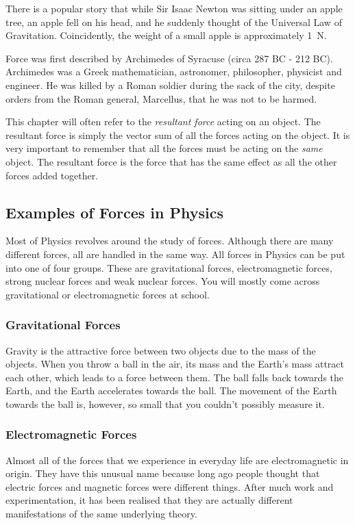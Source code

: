 \begin{IFact}{There is a popular story that while Sir Isaac Newton was sitting under an apple tree, an apple fell on his head, and he suddenly thought of the Universal Law of Gravitation. Coincidently, the weight of a small apple is approximately 1~N.}\end{IFact}

\begin{IFact}{Force was first described by Archimedes of Syracuse (circa 287 BC - 212 BC). Archimedes was a Greek mathematician, astronomer, philosopher, physicist and engineer. He was killed by a Roman soldier during the sack of the city, despite orders from the Roman general, Marcellus, that he was not to be harmed.}
\end{IFact}

This chapter will often refer to the \emph{resultant force} acting on an object. The resultant force is simply the vector sum of all the forces acting on the object. It is very important to remember that all the forces must be acting on the \emph{same} object. The resultant force is the force that has the same effect as all the other forces added together.

\subsection{Examples of Forces in Physics}
Most of Physics revolves around the study of forces. Although there are many different forces, all are handled in the same way. All forces in Physics can be put into one of four groups. These are gravitational forces, electromagnetic forces, strong nuclear forces and weak nuclear forces. You will mostly come across gravitational or electromagnetic forces at school.

\subsubsection{Gravitational Forces}
Gravity is the attractive force between two objects due to the mass of the objects. When you throw a ball in the air, its mass and the Earth's mass attract each other, which leads to a force between them. The ball falls back towards the Earth, and the Earth accelerates towards the ball. The movement of the Earth towards the ball is, however, so small that you couldn't possibly measure it.

\subsubsection{Electromagnetic Forces}
Almost all of the forces that we experience in everyday life are
electromagnetic in origin. They have this unusual name because long ago people thought that electric forces and magnetic forces were different things. After much work and experimentation, it has been realised that they are actually different manifestations of the same underlying theory.

